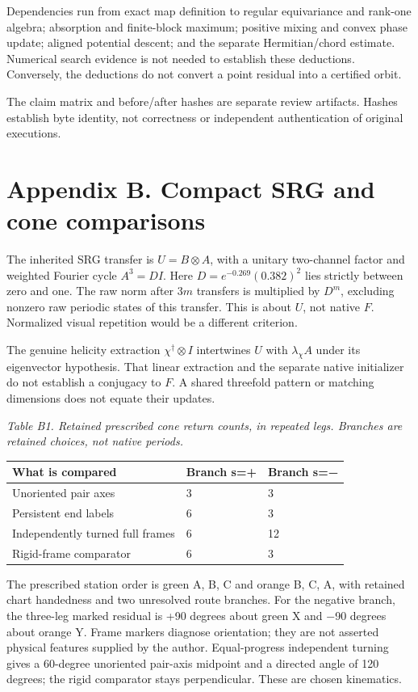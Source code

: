 \documentclass[11pt,a4paper]{article}
\begin{document}
Dependencies run from exact map definition to regular equivariance and rank-one algebra; absorption and finite-block maximum; positive mixing and convex phase update; aligned potential descent; and the separate Hermitian/chord estimate. Numerical search evidence is not needed to establish these deductions. Conversely, the deductions do not convert a point residual into a certified orbit.

The claim matrix and before/after hashes are separate review artifacts. Hashes establish byte identity, not correctness or independent authentication of original executions.

\clearpage
\section*{Appendix B. Compact SRG and cone comparisons}
The inherited SRG transfer is $U=B\otimes A$, with a unitary two-channel factor and weighted Fourier cycle $A^3=D I$. Here $D=e^{-0.269}(0.382)^2$ lies strictly between zero and one. The raw norm after $3m$ transfers is multiplied by $D^m$, excluding nonzero raw periodic states of this transfer. This is about $U$, not native $F$. Normalized visual repetition would be a different criterion. \cite{BRIDGE} \cite{D02}

The genuine helicity extraction $\chi^\dagger\otimes I$ intertwines $U$ with $\lambda_\chi A$ under its eigenvector hypothesis. That linear extraction and the separate native initializer do not establish a conjugacy to $F$. A shared threefold pattern or matching dimensions does not equate their updates.

\par\textit{Table B1. Retained prescribed cone return counts, in repeated legs. Branches are retained choices, not native periods.}\par
\begingroup\small
\begin{tabularx}{\textwidth}{XXX}
\toprule
What is compared & Branch s=+ & Branch s=−\\\midrule
Unoriented pair axes & 3 & 3\\
Persistent end labels & 6 & 3\\
Independently turned full frames & 6 & 12\\
Rigid-frame comparator & 6 & 3\\
\bottomrule\end{tabularx}\endgroup\par
The prescribed station order is green A, B, C and orange B, C, A, with retained chart handedness and two unresolved route branches. For the negative branch, the three-leg marked residual is +90 degrees about green X and −90 degrees about orange Y. Frame markers diagnose orientation; they are not asserted physical features supplied by the author. Equal-progress independent turning gives a 60-degree unoriented pair-axis midpoint and a directed angle of 120 degrees; the rigid comparator stays perpendicular. These are chosen kinematics. \cite{D01}
\end{document}
